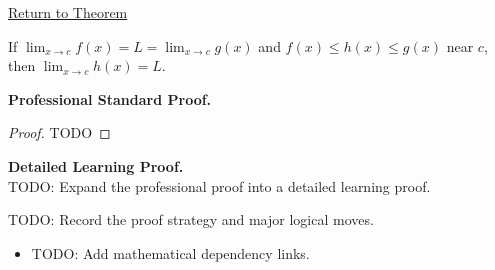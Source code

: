 \newpage
{}
\label{prf:squeeze-function-limits}

\begin{remark*}[Return]
\hyperref[thm:squeeze-function-limits]{Return to Theorem}
\end{remark*}

\begin{theorem*}
If $\lim_{x\to c}f(x)=L=\lim_{x\to c}g(x)$ and $f(x) \leq h(x) \leq g(x)$ near $c$, then $\lim_{x\to c}h(x)=L$.
\end{theorem*}

\textbf{Professional Standard Proof.}~\\
\begin{proof}
TODO
\end{proof}

\textbf{Detailed Learning Proof.}~\\
TODO: Expand the professional proof into a detailed learning proof.

\begin{remark*}
TODO: Record the proof strategy and major logical moves.
\end{remark*}

\begin{dependencies}
\begin{itemize}
  \item TODO: Add mathematical dependency links.
\end{itemize}
\end{dependencies}
